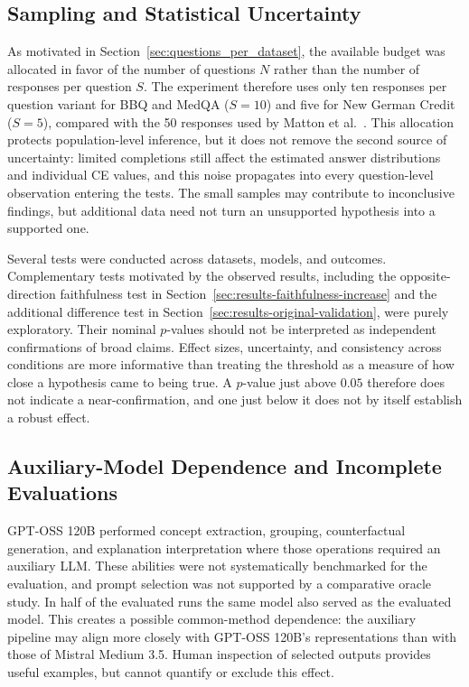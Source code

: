 \subsection{Sampling and Statistical Uncertainty}

As motivated in Section~\ref{sec:questions_per_dataset}, the available budget was allocated in favor of the number of questions $N$ rather than the number of responses per question $S$. The experiment therefore uses only ten responses per question variant for BBQ and MedQA ($S = 10$) and five for New German Credit ($S = 5$), compared with the 50 responses used by Matton et al.~\cite{mattonWalkTalkMeasuring2024}. This allocation protects population-level inference, but it does not remove the second source of uncertainty: limited completions still affect the estimated answer distributions and individual CE values, and this noise propagates into every question-level observation entering the tests. The small samples may contribute to inconclusive findings, but additional data need not turn an unsupported hypothesis into a supported one.

Several tests were conducted across datasets, models, and outcomes. Complementary tests motivated by the observed results, including the opposite-direction faithfulness test in Section~\ref{sec:results-faithfulness-increase} and the additional difference test in Section~\ref{sec:results-original-validation}, were purely exploratory. Their nominal $p$-values should not be interpreted as independent confirmations of broad claims. Effect sizes, uncertainty, and consistency across conditions are more informative than treating the threshold as a measure of how close a hypothesis came to being true. A $p$-value just above $0.05$ therefore does not indicate a near-confirmation, and one just below it does not by itself establish a robust effect.

\subsection{Auxiliary-Model Dependence and Incomplete Evaluations}
\label{sec:incomplete_evaluations}

GPT-OSS 120B performed concept extraction, grouping, counterfactual generation, and explanation interpretation where those operations required an auxiliary LLM. These abilities were not systematically benchmarked for the evaluation, and prompt selection was not supported by a comparative oracle study. In half of the evaluated runs the same model also served as the evaluated model. This creates a possible common-method dependence: the auxiliary pipeline may align more closely with GPT-OSS 120B's representations than with those of Mistral Medium 3.5. Human inspection of selected outputs provides useful examples, but cannot quantify or exclude this effect.

